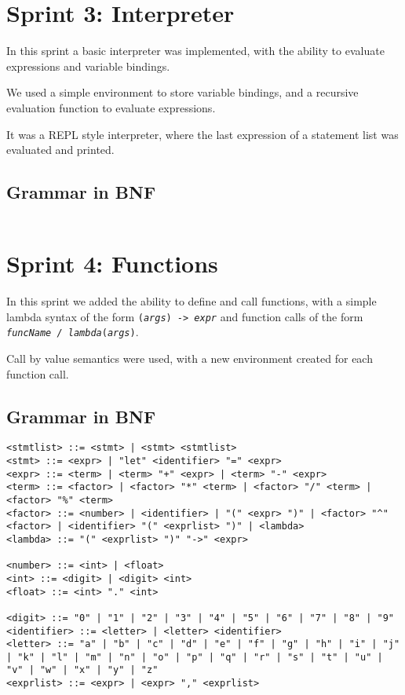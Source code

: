 \section{Sprint 3: Interpreter}\label{sec:interpreter}

In this sprint a basic interpreter was implemented, with the ability to evaluate expressions and variable bindings.

We used a simple environment to store variable bindings, and a recursive evaluation function to evaluate expressions.

It was a REPL style interpreter, where the last expression of a statement list was evaluated and printed.

\subsection{Grammar in BNF}\label{subsec:grammar-in-bnf3}

\begin{verbatim}

\end{verbatim}

\section{Sprint 4: Functions}\label{sec:functions}

In this sprint we added the ability to define and call functions, with a simple lambda syntax of the form 
\texttt{(\textit{args}) -> \textit{expr}} and function calls of the form \texttt{\textit{funcName / lambda}(\textit{args})}.

Call by value semantics were used, with a new environment created for each function call.

\subsection{Grammar in BNF}\label{subsec:grammar-in-bnf4}

\begin{verbatim}
<stmtlist> ::= <stmt> | <stmt> <stmtlist>
<stmt> ::= <expr> | "let" <identifier> "=" <expr>
<expr> ::= <term> | <term> "+" <expr> | <term> "-" <expr>
<term> ::= <factor> | <factor> "*" <term> | <factor> "/" <term> | <factor> "%" <term>
<factor> ::= <number> | <identifier> | "(" <expr> ")" | <factor> "^" <factor> | <identifier> "(" <exprlist> ")" | <lambda>
<lambda> ::= "(" <exprlist> ")" "->" <expr> 

<number> ::= <int> | <float>
<int> ::= <digit> | <digit> <int>
<float> ::= <int> "." <int>

<digit> ::= "0" | "1" | "2" | "3" | "4" | "5" | "6" | "7" | "8" | "9"
<identifier> ::= <letter> | <letter> <identifier>
<letter> ::= "a" | "b" | "c" | "d" | "e" | "f" | "g" | "h" | "i" | "j" | "k" | "l" | "m" | "n" | "o" | "p" | "q" | "r" | "s" | "t" | "u" | "v" | "w" | "x" | "y" | "z"
<exprlist> ::= <expr> | <expr> "," <exprlist>

\end{verbatim}

